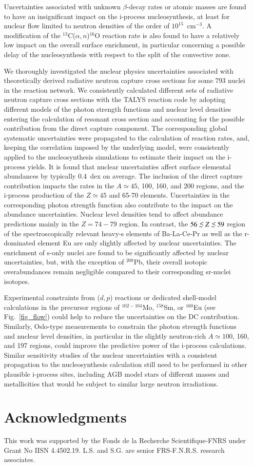 \documentclass{aa}
\def\la{\,\,\raise0.14em\hbox{$<$}\kern-0.76em\lower0.28em\hbox{$\sim$}\,\,}
\def\iso#1{$^{#1}$}
\def\an{$\alpha,n$}
\begin{document}
Uncertainties associated with unknown $\beta$-decay rates or atomic masses are found to have an insignificant impact on the i-process nucleosynthesis, at least for nuclear flow limited to neutron densities of the order of $10^{15}$~cm$^{-3}$. A modification of the  \iso{13}C(\an)\iso{16}O reaction rate is also found to have a relatively low impact on the overall surface enrichment, in particular concerning a possible delay of the nucleosynthesis with respect to the split of the convective zone.

We thoroughly investigated the nuclear physics uncertainties associated with theoretically derived radiative neutron capture cross sections for some 793 nuclei in the reaction network. We consistently calculated different sets of radiative neutron capture cross sections with the  {\sf TALYS} reaction code by adopting different models of the photon strength functions and nuclear level densities entering the calculation of resonant cross section and accounting for the possible contribution from the direct capture component.  The corresponding global systematic uncertainties were propagated to the calculation of reaction rates, and, keeping the correlation imposed by the underlying model,  were consistently applied to the nucleosynthesis simulations to estimate their impact on the i-process yields.
It is found that nuclear uncertainties affect surface elemental abundances by typically 0.4~dex
on average. The inclusion of the direct capture contribution impacts the rates in the $A\simeq 45$, 100, 160, and 200 regions, and the i-process production of the $Z\simeq 45$ and 65-70 elements. Uncertainties in the corresponding photon strength function also contribute to the impact on the abundance uncertainties. Nuclear level densities tend to affect abundance predictions mainly in the $Z=74-79$ region. In contrast, the  $56 \la Z \la 59$ region of the spectroscopically relevant heavy-s elements of Ba-La-Ce-Pr  as well as the r-dominated element Eu are  only slightly affected by nuclear uncertainties. The enrichment of s-only nuclei are found to be significantly affected by nuclear uncertainties, but, with the exception of $^{208}$Pb, their overall isotopic overabundances remain negligible compared to their corresponding sr-nuclei isotopes.

Experimental constraints from ($d,p$) reactions or dedicated shell-model calculations in the precursor regions of $^{102-104}$Mo, $^{158}$Sm, or $^{160}$Eu (see Fig.~\ref{fig_flow}) could help to reduce the uncertainties on the DC contribution. Similarly, Oslo-type measurements to constrain the photon strength functions and nuclear level densities, in particular in the slightly neutron-rich $A\simeq 100$, 160, and 197 regions, could improve the predictive power of the i-process calculations. Similar sensitivity studies of the nuclear uncertainties with a consistent propagation to the nucleosynthesis calculation still need to be performed in other plausible i-process sites, including AGB model stars of different masses and metallicities that would be subject to similar large neutron irradiations.



\section*{Acknowledgments}
This work was supported by the Fonds de la Recherche Scientifique-FNRS under Grant No IISN 4.4502.19.
L.S. and S.G. are senior FRS-F.N.R.S. research associates.




\end{document}
